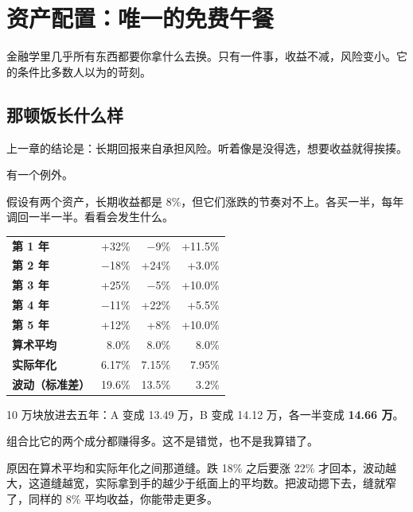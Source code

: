 \chapter{资产配置：唯一的免费午餐}

\begin{ledetext}
金融学里几乎所有东西都要你拿什么去换。只有一件事，收益不减，风险变小。它的条件比多数人以为的苛刻。
\end{ledetext}

\section{那顿饭长什么样}

上一章的结论是：长期回报来自承担风险。听着像是没得选，想要收益就得挨揍。

有一个例外。

假设有两个资产，长期收益都是 8\%，但它们涨跌的节奏对不上。各买一半，每年调回一半一半。看看会发生什么。

\begin{tablewrap}
\begin{xltabular}{\linewidth}{Xrrr}
\toprule
{} &  &  &  \\
\midrule
\textbf{第 1 年} & +32\% & −9\% & +11.5\% \\
\textbf{第 2 年} & −18\% & +24\% & +3.0\% \\
\textbf{第 3 年} & +25\% & −5\% & +10.0\% \\
\textbf{第 4 年} & −11\% & +22\% & +5.5\% \\
\textbf{第 5 年} & +12\% & +8\% & +10.0\% \\
\textbf{\textbf{算术平均}} & 8.0\% & 8.0\% & 8.0\% \\
\textbf{\textbf{实际年化}} & 6.17\% & 7.15\% & 7.95\% \\
\textbf{\textbf{波动（标准差）}} & 19.6\% & 13.5\% & 3.2\% \\
\bottomrule
\end{xltabular}
\end{tablewrap}

10 万块放进去五年：A 变成 13.49 万，B 变成 14.12 万，各一半变成 \textbf{14.66 万}。

组合比它的两个成分都赚得多。这不是错觉，也不是我算错了。

原因在算术平均和实际年化之间那道缝。跌 18\% 之后要涨 22\% 才回本，波动越大，这道缝越宽，实际拿到手的越少于纸面上的平均数。把波动摁下去，缝就窄了，同样的 8\% 平均收益，你能带走更多。

